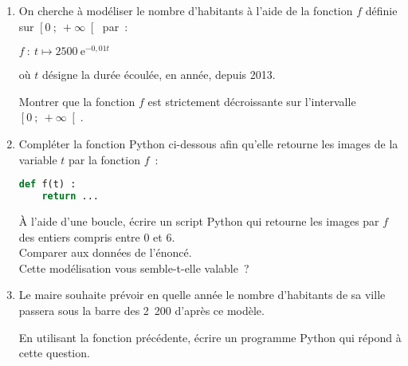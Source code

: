 \begin{enumerate}
     \item
     On cherche à modéliser le nombre d'habitants à l'aide de la fonction $f$ définie sur $ \left[ 0~;~ +\infty \right[ $ par~:
     \begin{center}
          $f~: \ t \longmapsto 2500\ \text{e}^{ -0,01t } $
     \end{center}
     où $t$ désigne la durée écoulée, en année, depuis 2013.
     \par
     Montrer que la fonction $f$ est strictement décroissante sur l'intervalle $ \left[ 0~;~ +\infty \right[ $.
     \item
     Compléter la fonction Python ci-dessous afin qu'elle retourne les images de la variable $t$ par la fonction $f$~:
\begin{lstlisting}[language=Python]
def f(t) :
    return ...
\end{lstlisting}
À l'aide d'une boucle, écrire un script Python qui retourne les images par $f$ des entiers compris entre 0 et 6.
\\ Comparer aux données de l'énoncé.
\\ Cette modélisation vous semble-t-elle valable~?
\item
Le maire souhaite prévoir en quelle année le nombre d'habitants de sa ville passera sous la barre des 2~200 d'après ce modèle.
\par
En utilisant la fonction précédente, écrire un programme Python qui répond à cette question.
\end{enumerate}
